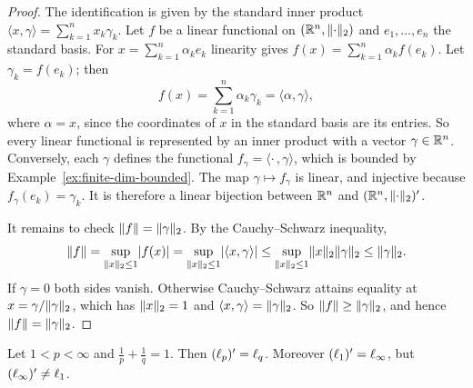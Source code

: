 \begin{proof}
The identification is given by the standard inner product
$\langle x, \gamma \rangle = \sum_{k=1}^{n} x_k \gamma_k$. Let $f$ be a
linear functional on $(\mathbb{R}^n, \lVert\cdot\rVert_2)$ and $e_1, \dots, e_n$ the
standard basis. For $x = \sum_{k=1}^{n} \alpha_k e_k$ linearity gives
$f(x) = \sum_{k=1}^{n} \alpha_k f(e_k)$. Let $\gamma_k = f(e_k)$; then
\[
  f(x) = \sum_{k=1}^{n} \alpha_k \gamma_k = \langle \alpha, \gamma \rangle ,
\]
where $\alpha = x$, since the coordinates of $x$ in the standard basis are
its entries. So every linear functional is represented by an inner product
with a vector $\gamma \in \mathbb{R}^n$. Conversely, each $\gamma$ defines the
functional $f_\gamma = \langle \cdot\,, \gamma \rangle$, which is bounded by
Example~\ref{ex:finite-dim-bounded}. The map $\gamma \mapsto f_\gamma$ is
linear, and injective because $f_\gamma(e_k) = \gamma_k$. It is therefore a
linear bijection between $\mathbb{R}^n$ and $(\mathbb{R}^n, \lVert\cdot\rVert_2)'$.

It remains to check $\lVert f\rVert = \lVert\gamma\rVert_2$. By the Cauchy--Schwarz
inequality,
\[
  \lVert f\rVert = \sup_{\lVert x\rVert_2 \le 1} \lvert f(x)\rvert
  = \sup_{\lVert x\rVert_2 \le 1} \lvert\langle x, \gamma \rangle\rvert
  \le \sup_{\lVert x\rVert_2 \le 1} \lVert x\rVert_2 \lVert\gamma\rVert_2
  \le \lVert\gamma\rVert_2 .
\]
If $\gamma = 0$ both sides vanish. Otherwise Cauchy--Schwarz attains
equality at $x = \gamma / \lVert\gamma\rVert_2$, which has $\lVert x\rVert_2 = 1$ and
$\langle x, \gamma \rangle = \lVert\gamma\rVert_2$. So
$\lVert f\rVert \ge \lVert\gamma\rVert_2$, and hence $\lVert f\rVert = \lVert\gamma\rVert_2$.
\end{proof}

\begin{theorem}\label{thm:lp-duality}
Let $1 < p < \infty$ and $\frac{1}{p} + \frac{1}{q} = 1$. Then
$(\ell_{p})' = \ell_{q}$. Moreover $(\ell_{1})' = \ell_{\infty}$, but
$(\ell_{\infty})' \ne \ell_{1}$.
\end{theorem}

